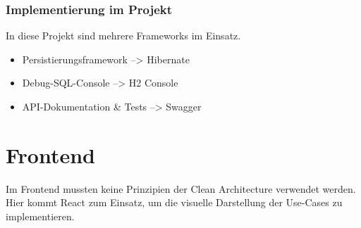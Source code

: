     	    \subsubsection{Implementierung im Projekt}
    	    In diese Projekt sind mehrere Frameworks im Einsatz. \\
    	    \begin{itemize}
    	        \item Persistierungsframework --> Hibernate
    	        \item Debug-SQL-Console --> H2 Console
    	        \item API-Dokumentation \& Tests --> Swagger
    	    \end{itemize}

    \section{Frontend}
    Im Frontend mussten keine Prinzipien der Clean Architecture verwendet werden. Hier kommt React zum Einsatz, um die visuelle Darstellung der Use-Cases zu implementieren.